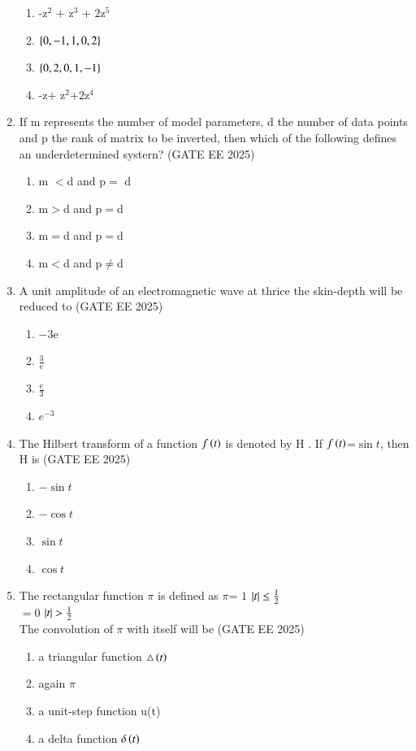 \documentclass[journal]{IEEEtran}
\begin{document}
\begin{enumerate}[start=26]
\begin{enumerate}
    \item -z$^2$ $+$ z$^3$ $+$ $2$z$^5$
    \item $\left\{0,-1,1,0,2\right\}$
    \item $\left\{0,2,0,1,-1\right\}$
    \item -z$+$ z$^2$+$2$z$^4$
\end{enumerate}
\item If m represents the number of model parameters, d the number of data points and p the rank of matrix to be inverted, then which of the following defines an underdetermined systern?
\hfill{(GATE EE 2025)}
\begin{enumerate}
    \item  m $<$d and p$=$ d
\item  m$>$d and p$=$d
\item  m$=$d and p$=$d
\item  m$<$d and p$\neq$d
\end{enumerate}

\item A unit amplitude of an electromagnetic wave at thrice the skin-depth will be reduced to
\hfill{(GATE EE 2025)}
\begin{enumerate}
    \item $-3$e
\item $\frac{3}{\text{e}}$
\item $\frac{\text{e}}{3}$
\item $e^{-3}$
\end{enumerate}

\item The Hilbert transform of a function $f\left(t\right)$ is denoted by H . If $f\left(t\right)$=$\sin{t}$, then H  is
\hfill{(GATE EE 2025)}
\begin{enumerate}
    \item $-\sin{t}$
\item $-\cos{t}$
\item $\sin{t}$
\item $\cos{t}$
\end{enumerate}

\item The rectangular function $\pi$ is defined as $\pi$= $1$ \hspace{0.7cm}   $\left\vert t\right\vert\leq \frac{1}{2}$\\
\hspace*{6.7cm} $=0$ \hspace{0.7cm} $\left\vert t\right\vert >\frac{1}{2}$\\
The convolution of $\pi$ with itself will be 
\hfill{(GATE EE 2025)}
\begin{enumerate}
    \item a triangular function $\triangle\left(t\right)$
    \item  again $\pi$
\item a unit-step function u(t)
\item a delta function $\delta\left(t\right)$
\end{enumerate}


\end{enumerate}
\end{document}
